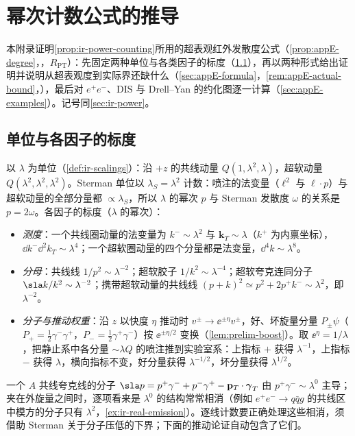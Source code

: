 \chapter{幂次计数公式的推导}\label{app:appE}

本附录证明\cref{prop:ir-power-counting}所用的超表观红外发散度公式（\cref{prop:appE-degree}，\tagR，$R_{\mathrm{PT}}$）：先固定两种单位与各类因子的标度（\cref{sec:appE-units}），再以两种形式给出证明并说明从超表观度到实际界还缺什么（\cref{sec:appE-formula}，\cref{rem:appE-actual-bound}，\tagA），最后对 $e^+e^-$、DIS 与 Drell--Yan 的约化图逐一计算（\cref{sec:appE-examples}）。记号同\cref{sec:ir-power}。

\section{单位与各因子的标度}\label{sec:appE-units}

以 $\lambda$ 为单位（\cref{def:ir-scalings}）：沿 $+z$ 的共线动量 $Q(1,\lambda^2,\lambda)$，超软动量 $Q(\lambda^2,\lambda^2,\lambda^2)$。Sterman 单位以 $\lambda_S=\lambda^2$ 计数：喷注的法变量（$\ell^2$ 与 $\ell\cdot p$）与超软动量的全部分量都 $\propto\lambda_S$，所以 $\lambda$ 的幂次 $p$ 与 Sterman 发散度 $\omega$ 的关系是 $p=2\omega$\cite[第~2.4~节]{Sterman:1995fz}。各因子的标度（$\lambda$ 的幂次）：
\begin{itemize}[leftmargin=2em,itemsep=0pt,topsep=2pt]
\item \emph{测度}：一个共线圈动量的法变量为 $k^-\sim\lambda^2$ 与 $\mathbf k_T\sim\lambda$（$k^+$ 为内禀坐标），$\dd k^-\dd^2k_T\sim\lambda^4$；一个超软圈动量的四个分量都是法变量，$\dd^4k\sim\lambda^8$。
\item \emph{分母}：共线线 $1/p^2\sim\lambda^{-2}$；超软胶子 $1/k^2\sim\lambda^{-4}$；超软夸克连同分子 $\sla k/k^2\sim\lambda^{-2}$；携带超软动量的共线线 $(p+k)^2\simeq p^2+2p^+k^-\sim\lambda^2$，即 $\lambda^{-2}$。
\item \emph{分子与推动权重}：沿 $z$ 以快度 $\eta$ 推动时 $v^\pm\to\ee^{\pm\eta}v^\pm$，好、坏旋量分量 $P_\pm\psi$（$P_+=\frac12\gamma^-\gamma^+$，$P_-=\frac12\gamma^+\gamma^-$）按 $\ee^{\pm\eta/2}$ 变换（\cref{lem:prelim-boost}）。取 $\ee^\eta=1/\lambda$，把静止系中各分量 $\sim\lambda Q$ 的喷注推到实验室系：上指标 $+$ 获得 $\lambda^{-1}$，上指标 $-$ 获得 $\lambda$，横向指标不变，好分量获得 $\lambda^{-1/2}$，坏分量获得 $\lambda^{1/2}$。
\end{itemize}
一个 $A$ 共线夸克线的分子 $\sla p=p^+\gamma^-+p^-\gamma^+-\mathbf p_T\cdot\boldsymbol\gamma_T$ 由 $p^+\gamma^-\sim\lambda^0$ 主导；夹在外旋量之间时，逐项看来是 $\lambda^0$ 的结构常常相消（例如 $e^+e^-\to q\bar qg$ 的共线区中模方的分子只有 $\lambda^2$，\cref{ex:ir-real-emission}）。逐线计数要正确处理这些相消，须借助 Sterman 关于分子压低的下界\cite[式~(65)]{Sterman:1995fz}；下面的推动论证自动包含了它们。

